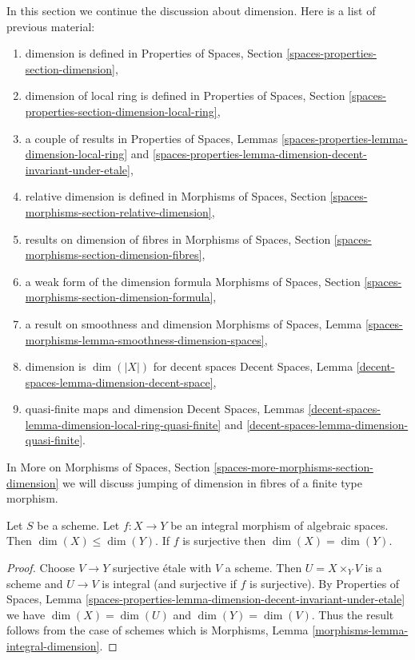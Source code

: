 \noindent
In this section we continue the discussion about dimension.
Here is a list of previous material:
\begin{enumerate}
\item dimension is defined in
Properties of Spaces, Section
\ref{spaces-properties-section-dimension},
\item dimension of local ring is defined in
Properties of Spaces, Section
\ref{spaces-properties-section-dimension-local-ring},
\item a couple of results in Properties of Spaces, Lemmas
\ref{spaces-properties-lemma-dimension-local-ring} and
\ref{spaces-properties-lemma-dimension-decent-invariant-under-etale},
\item relative dimension is defined in
Morphisms of Spaces, Section \ref{spaces-morphisms-section-relative-dimension},
\item results on dimension of fibres in
Morphisms of Spaces, Section \ref{spaces-morphisms-section-dimension-fibres},
\item a weak form of the dimension formula
Morphisms of Spaces, Section \ref{spaces-morphisms-section-dimension-formula},
\item a result on smoothness and dimension Morphisms of Spaces, Lemma
\ref{spaces-morphisms-lemma-smoothness-dimension-spaces},
\item dimension is $\dim(|X|)$ for decent spaces
Decent Spaces, Lemma \ref{decent-spaces-lemma-dimension-decent-space},
\item quasi-finite maps and dimension
Decent Spaces, Lemmas
\ref{decent-spaces-lemma-dimension-local-ring-quasi-finite} and
\ref{decent-spaces-lemma-dimension-quasi-finite}.
\end{enumerate}
In More on Morphisms of Spaces, Section
\ref{spaces-more-morphisms-section-dimension}
we will discuss jumping of
dimension in fibres of a finite type morphism.

\begin{lemma}
\label{lemma-integral-dimension}
Let $S$ be a scheme. Let $f : X \to Y$ be an integral morphism
of algebraic spaces. Then $\dim(X) \leq \dim(Y)$.
If $f$ is surjective then $\dim(X) = \dim(Y)$.
\end{lemma}

\begin{proof}
Choose $V \to Y$ surjective \'etale with $V$ a scheme.
Then $U = X \times_Y V$ is a scheme and $U \to V$ is integral
(and surjective if $f$ is surjective).
By Properties of Spaces, Lemma
\ref{spaces-properties-lemma-dimension-decent-invariant-under-etale}
we have $\dim(X) = \dim(U)$ and $\dim(Y) = \dim(V)$.
Thus the result follows from the case of schemes
which is Morphisms, Lemma \ref{morphisms-lemma-integral-dimension}.
\end{proof}

